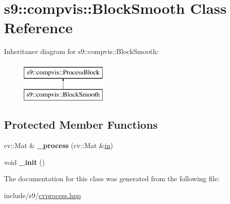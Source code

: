 \hypertarget{classs9_1_1compvis_1_1BlockSmooth}{\section{s9\-:\-:compvis\-:\-:\-Block\-Smooth \-Class \-Reference}
\label{classs9_1_1compvis_1_1BlockSmooth}
}
\-Inheritance diagram for s9\-:\-:compvis\-:\-:\-Block\-Smooth\-:\begin{figure}[H]
\begin{center}
\leavevmode
\includegraphics[height=2.000000cm]{classs9_1_1compvis_1_1BlockSmooth}
\end{center}
\end{figure}
\subsection*{\-Protected \-Member \-Functions}
\begin{DoxyCompactItemize}
\item 
\hypertarget{classs9_1_1compvis_1_1BlockSmooth_aca7037ceb9993dc9d809f14367f1318b}{cv\-::\-Mat \& {\bfseries \-\_\-process} (cv\-::\-Mat \&\hyperlink{structin}{in})}\label{classs9_1_1compvis_1_1BlockSmooth_aca7037ceb9993dc9d809f14367f1318b}

\item 
\hypertarget{classs9_1_1compvis_1_1BlockSmooth_a16c965bc021eb6e91e36989ebdd69236}{void {\bfseries \-\_\-init} ()}\label{classs9_1_1compvis_1_1BlockSmooth_a16c965bc021eb6e91e36989ebdd69236}

\end{DoxyCompactItemize}


\-The documentation for this class was generated from the following file\-:\begin{DoxyCompactItemize}
\item 
include/s9/\hyperlink{cvprocess_8hpp}{cvprocess.\-hpp}\end{DoxyCompactItemize}
